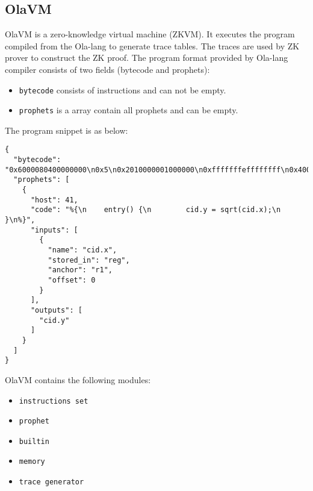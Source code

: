 \subsection{OlaVM} \label{sec:ola-vm}

OlaVM is a zero-knowledge virtual machine (ZKVM). It executes the program compiled from the Ola-lang to generate trace tables. The traces are used by ZK prover to construct the ZK proof.
The program format provided by Ola-lang compiler consists of two fields (bytecode and prophets):
\begin{itemize}
    \item \verb|bytecode| consists of instructions and can not be empty.
    \item \verb|prophets| is a array contain all prophets and can be empty.
\end{itemize}

The program snippet is as below:
\begin{lstlisting}[label={lst:program-demo}]
{
  "bytecode": "0x6000080400000000\n0x5\n0x2010000001000000\n0xfffffffeffffffff\n0x4000000840000000\n0x0\n0x0030000001000000\n",
  "prophets": [
    {
      "host": 41,
      "code": "%{\n    entry() {\n        cid.y = sqrt(cid.x);\n    }\n%}",
      "inputs": [
        {
          "name": "cid.x",
          "stored_in": "reg",
          "anchor": "r1",
          "offset": 0
        }
      ],
      "outputs": [
        "cid.y"
      ]
    }
  ]
}
\end{lstlisting}


OlaVM contains the following modules:
\begin{itemize}
    \item \verb|instructions set|
    \item \verb|prophet|
    \item \verb|builtin|
    \item \verb|memory|
    \item \verb|trace generator|
\end{itemize}





